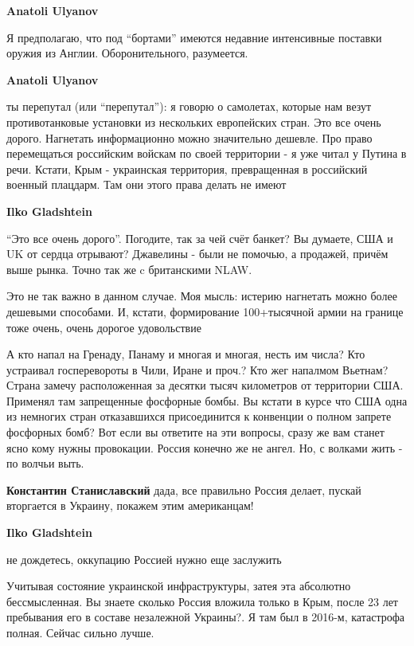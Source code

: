 \begin{itemize}
\begin{itemize}
\textbf{Anatoli Ulyanov} 

Я предполагаю, что под \enquote{бортами} имеются недавние интенсивные поставки оружия
из Англии. Оборонительного, разумеется.

\textbf{Anatoli Ulyanov} 

ты перепутал (или \enquote{перепутал}): я говорю о самолетах, которые нам везут
противотанковые установки из нескольких европейских стран. Это все очень
дорого. Нагнетать информационно можно значительно дешевле. Про право
перемещаться российским войскам по своей территории - я уже читал у Путина в
речи. Кстати, Крым - украинская территория, превращенная в российский военный
плацдарм. Там они этого права делать не имеют


\textbf{Ilko Gladshtein} 

\enquote{Это все очень дорого}. Погодите, так за чей счёт банкет? Вы думаете, США и UK
от сердца отрывают? Джавелины - были не помочью, а продажей, причём выше рынка.
Точно так же c британскими NLAW.


Это не так важно в данном случае. Моя мысль: истерию нагнетать можно более
дешевыми способами. И, кстати, формирование 100+тысячной армии на границе тоже
очень, очень дорогое удовольствие

А кто напал на Гренаду, Панаму и многая и многая, несть им числа?
Кто устраивал госперевороты в Чили, Иране и проч.?
Кто жег напалмом Вьетнам? Страна замечу расположенная за десятки тысяч километров от территории США. Применял там запрещенные фосфорные бомбы. Вы кстати в курсе что США одна из немногих стран отказавшихся присоединится к конвенции о полном запрете фосфорных бомб?
Вот если вы ответите на эти вопросы, сразу же вам станет ясно кому нужны провокации.
Россия конечно же не ангел. Но, с волками жить - по волчьи выть.

\textbf{Константин Станиславский} дада, все правильно Россия делает, пускай вторгается в Украину, покажем этим американцам!

\textbf{Ilko Gladshtein} 

не дождетесь, оккупацию Россией нужно еще заслужить

Учитывая состояние украинской инфраструктуры, затея эта абсолютно
бессмысленная. Вы знаете сколько Россия вложила только в Крым, после 23 лет
пребывания его в составе незалежной Украины?. Я там был в 2016-м, катастрофа
полная. Сейчас сильно лучше.


\end{itemize}
\end{itemize}
